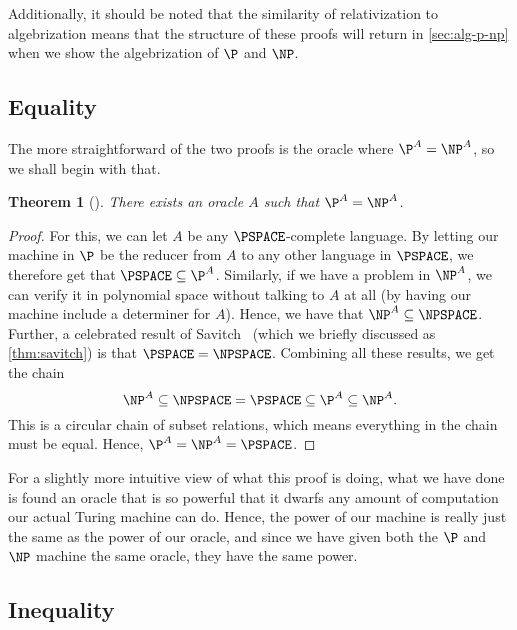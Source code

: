 \documentclass[english,12pt]{reedthesis}
\theoremstyle{plain}
\newtheorem{thm}{Theorem}[section]
\theoremstyle{definition}
\theoremstyle{remark}
\begin{document}
Additionally, it should be noted that the similarity of relativization to
algebrization means that the structure of these proofs will return in
\cref{sec:alg-p-np} when we show the algebrization of $\P$ and $\NP$.

\subsection{Equality}

The more straightforward of the two proofs is the oracle where
$\P^{A} = \NP^{A}$, so we shall begin with that.

\begin{thm}[{\cite[Theorem 2]{BGS75}}]\label{thm:p-np-rel}
  There exists an oracle $A$ such that $\P^{A} = \NP^{A}$.
\end{thm}

\begin{proof}
  For this, we can let $A$ be any $\PSPACE$-complete language. By letting our
  machine in $\P$ be the reducer from $A$ to any other language in $\PSPACE$, we
  therefore get that $\PSPACE \subseteq \P^{A}$. Similarly, if we have a problem in
  $\NP^{A}$, we can verify it in polynomial space without talking to $A$ at all
  (by having our machine include a determiner for $A$). Hence, we have that
  $\NP^{A} \subseteq \NPSPACE$. Further, a celebrated result of Savitch~\cite{Sav70}
  (which we briefly discussed as \cref{thm:savitch}) is that
  $\PSPACE = \NPSPACE$. Combining all these results, we get the chain
  \begin{equation}
    \NP^{A} \subseteq \NPSPACE = \PSPACE \subseteq \P^{A} \subseteq \NP^{A}.
  \end{equation}
  This is a circular chain of subset relations, which means everything in the
  chain must be equal. Hence, $\P^{A} = \NP^{A} = \PSPACE$.
\end{proof}

For a slightly more intuitive view of what this proof is doing, what we have
done is found an oracle that is so powerful that it dwarfs any amount of
computation our actual Turing machine can do. Hence, the power of our machine is
really just the same as the power of our oracle, and since we have given both
the $\P$ and $\NP$ machine the same oracle, they have the same power.

\subsection{Inequality}
\end{document}
